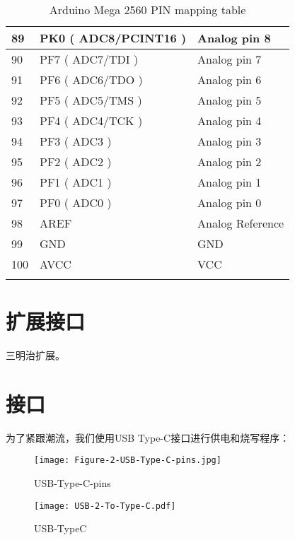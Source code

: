 \begin{longtable}[c]{|l|l|l|}
    89         & PK0 ( ADC8/PCINT16 )     & Analog pin 8          \\ \hline
    90         & PF7 ( ADC7/TDI )         & Analog pin 7          \\ \hline
    91         & PF6 ( ADC6/TDO )         & Analog pin 6          \\ \hline
    92         & PF5 ( ADC5/TMS )         & Analog pin 5          \\ \hline
    93         & PF4 ( ADC4/TCK )         & Analog pin 4          \\ \hline
    94         & PF3 ( ADC3 )             & Analog pin 3          \\ \hline
    95         & PF2 ( ADC2 )             & Analog pin 2          \\ \hline
    96         & PF1 ( ADC1 )             & Analog pin 1          \\ \hline
    97         & PF0 ( ADC0 )             & Analog pin 0          \\ \hline
    98         & AREF                     & Analog Reference      \\ \hline
    99         & GND                      & GND                   \\ \hline
    100        & AVCC                     & VCC                   \\ \hline
    \caption{Arduino Mega 2560 PIN mapping table}
    \label{tab:PinMap}\\
\end{longtable}

\section{扩展接口}

三明治扩展。

\section{接口}
为了紧跟潮流，我们使用USB Type-C接口进行供电和烧写程序：

\begin{figure}[htbp]
    \centering
    \texttt{[image: Figure-2-USB-Type-C-pins.jpg]}
    \caption{USB-Type-C-pins}
    \label{fig:USB-Type-C-pins}
\end{figure}

\begin{figure}[htbp]
    \centering
    \texttt{[image: USB-2-To-Type-C.pdf]}
    \caption{USB-TypeC}
    \label{fig:USB-TypeC}
\end{figure}